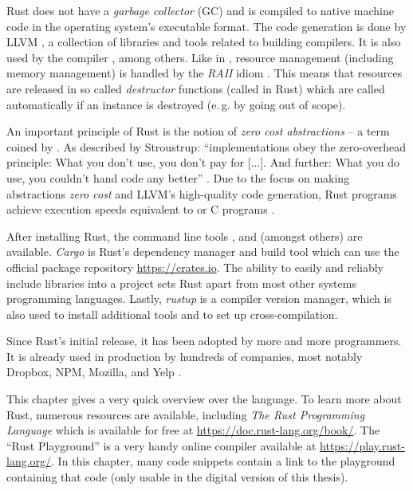 Rust does not have a \emph{garbage collector} (GC) and is compiled to native machine code in the operating system's executable format.
The code generation is done by LLVM \cite{llvmwebsite, lattner2004llvm}, a collection of libraries and tools related to building compilers.
It is also used by the \cpp compiler , among others.
Like in \cpp, resource management (including memory management) is handled by the \emph{RAII} idiom \cite{raiihackcraft, stroustrup2001exception}.
This means that resources are released in so called \emph{destructor} functions (called  in Rust) which are called automatically if an instance is destroyed (e.\,g. by going out of scope).

An important principle of Rust is the notion of \emph{zero cost abstractions} -- a term coined by \cpp.
As described by Stroustrup: \enquote{\cpp implementations obey the zero-overhead principle: What you don’t use, you don’t pay for [...]. And further: What you do use, you couldn’t hand code any better} \cite{stroustrup2012foundations}.
Due to the focus on making abstractions \emph{zero cost} and LLVM's high-quality code generation, Rust programs achieve execution speeds equivalent to \cpp or C programs \cite{benchmarkgame}.

After installing Rust, the command line tools ,  and  (amongst others) are available.
\emph{Cargo} is Rust's dependency manager and build tool which can use the official package repository \url{https://crates.io}.
The ability to easily and reliably include libraries into a project sets Rust apart from most other systems programming languages.
Lastly, \emph{rustup} is a compiler version manager, which is also used to install additional tools and to set up cross-compilation.

Since Rust's initial release, it has been adopted by more and more programmers.
It is already used in production by hundreds of companies, most notably Dropbox, NPM, Mozilla, and Yelp \cite{rust-production}.

This chapter gives a very quick overview over the language.
To learn more about Rust, numerous resources are available, including \emph{The Rust Programming Language} \cite{klabnik2018rust} which is available for free at \url{https://doc.rust-lang.org/book/}.
The \enquote{Rust Playground} is a very handy online compiler available at \url{https://play.rust-lang.org/}.
In this chapter, many code snippets contain a link to the playground containing that code (only usable in the digital version of this thesis).

